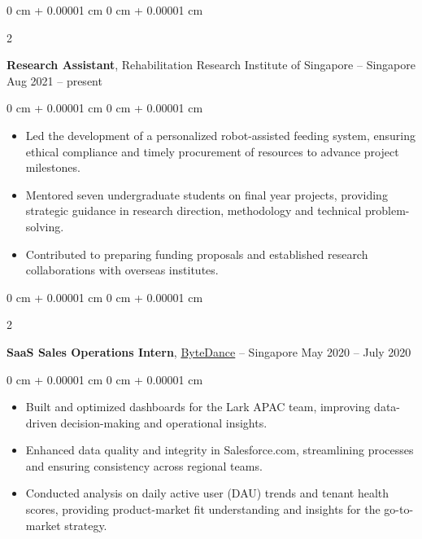 \documentclass[10pt, letterpaper]{article}
\newenvironment{highlights}{
    \begin{itemize}[
        topsep=0.10 cm,
        parsep=0.10 cm,
        partopsep=0pt,
        itemsep=0pt,
        leftmargin=0 cm + 10pt
    ]
}{
    \end{itemize}
} %
\newenvironment{onecolentry}{
    \begin{adjustwidth}{
        0 cm + 0.00001 cm
    }{
        0 cm + 0.00001 cm
    }
}{
    \end{adjustwidth}
} %
\newenvironment{twocolentry}[2][]{
    \onecolentry
    \def\secondColumn{#2}
    \setcolumnwidth{\fill, 4.5 cm}
    \begin{paracol}{2}
}{
    \switchcolumn \raggedleft \secondColumn
    \end{paracol}
    \endonecolentry
} %
\begin{document}
        
        \begin{twocolentry}{
            Aug 2021 – present
        }
            \textbf{Research Assistant}, Rehabilitation Research Institute of Singapore -- Singapore\end{twocolentry}

        \vspace{0.10 cm}
        \begin{onecolentry}
            \begin{highlights}
                \item Led the development of a personalized robot-assisted feeding system, ensuring ethical compliance and timely procurement of resources to advance project milestones.
                \item Mentored seven undergraduate students on final year projects, providing strategic guidance in research direction, methodology and technical problem-solving.
                \item Contributed to preparing funding proposals and established research collaborations with overseas institutes.
            \end{highlights}
        \end{onecolentry}


        \vspace{0.2 cm}

        \begin{twocolentry}{
            May 2020 – July 2020
        }
            \textbf{SaaS Sales Operations Intern}, \href{https://www.bytedance.com/en/}{ByteDance} -- Singapore\end{twocolentry}

        \vspace{0.10 cm}
        \begin{onecolentry}
            \begin{highlights}
                \item Built and optimized dashboards for the Lark APAC team, improving data-driven decision-making and operational insights.
                \item Enhanced data quality and integrity in Salesforce.com, streamlining processes and ensuring consistency across regional teams.
                \item Conducted analysis on daily active user (DAU) trends and tenant health scores, providing product-market fit understanding and insights for the go-to-market strategy.
            \end{highlights}
        \end{onecolentry}
\end{document}
